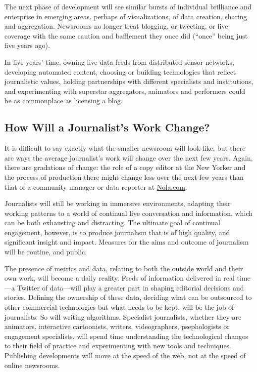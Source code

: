 The next phase of development will see similar bursts of individual brilliance
and enterprise in emerging areas, perhaps of visualizations, of data creation, sharing
and aggregation. Newsrooms no longer treat blogging, or tweeting, or live
coverage with the same caution and bafflement they once did (``once'' being just
five years ago).

In five years’ time, owning live data feeds from distributed sensor networks,
developing automated content, choosing or building technologies that reflect
journalistic values, holding partnerships with different specialists and institutions,
and experimenting with superstar aggregators, animators and performers could
be as commonplace as licensing a blog.

\subsection{How Will a Journalist’s Work Change?}

It is difficult to say exactly what the smaller newsroom will look like, but there
are ways the average journalist’s work will change over the next few years. Again,
there are gradations of change: the role of a copy editor at the New Yorker and
the process of production there might change less over the next few years than
that of a community manager or data reporter at \href{http://nola.com}{Nola.com}.

Journalists will still be working in immersive environments, adapting their working
patterns to a world of continual live conversation and information, which can
be both exhausting and distracting. The ultimate goal of continual engagement,
however, is to produce journalism that is of high quality, and significant insight
and impact. Measures for the aims and outcome of journalism will be routine,
and public.

The presence of metrics and data, relating to both the outside world and their
own work, will become a daily reality. Feeds of information delivered in real
time—a Twitter of data—will play a greater part in shaping editorial decisions
and stories. Defining the ownership of these data, deciding what can be outsourced
to other commercial technologies but what needs to be kept, will be the
job of journalists. So will writing algorithms.
Specialist journalists, whether they are animators, interactive cartoonists, writers,
videographers, psephologists or engagement specialists, will spend time understanding
the technological changes to their field of practice and experimenting
with new tools and techniques. Publishing developments will move at the speed
of the web, not at the speed of online newsrooms.

